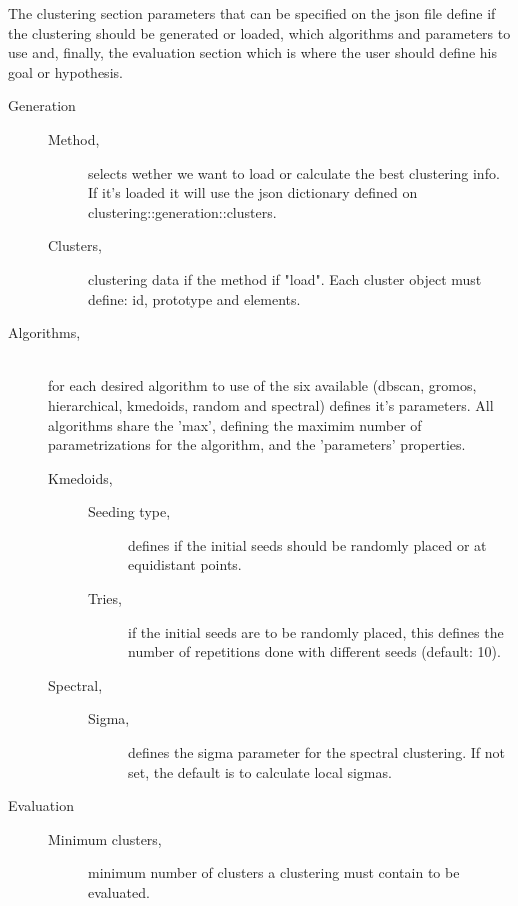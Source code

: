 The clustering section parameters that can be specified on the json file define if the clustering should be generated or loaded, which algorithms and parameters to use and, finally, the evaluation section which is where the user should define his goal or hypothesis.

\begin{description}
\item [Generation] \hfil
\begin{description}
\item [Method,] selects wether we want to load or calculate the best clustering info. If it's loaded it will use the json dictionary defined on clustering::generation::clusters.
\item [Clusters,] clustering data if the method if "load". Each cluster object must define: id, prototype and elements.
\end{description}
\item [Algorithms,] \hfil \\for each desired algorithm to use of the six available (dbscan, gromos, hierarchical, kmedoids, random and spectral) defines it's parameters. All algorithms share the 'max', defining the maximim number of parametrizations for the algorithm, and the 'parameters' properties.
\begin{description}
\item [Kmedoids, ] \hfil 
\begin{description}
\item [Seeding type,] defines if the initial seeds should be randomly placed or at equidistant points.
\item [Tries,] if the initial seeds are to be randomly placed, this defines the number of repetitions done with different seeds (default: 10).
\end{description} 
\end{description}
\begin{description}
\item [Spectral, ] \hfil 
\begin{description}
\item [Sigma,] defines the sigma parameter for the spectral clustering. If not set, the default is to calculate local sigmas.
\end{description} 
\end{description}
\item [Evaluation] \hfil
\begin{description}
\item [Minimum clusters,] minimum number of clusters a clustering must contain to be evaluated.

\end{description}
\end{description}
